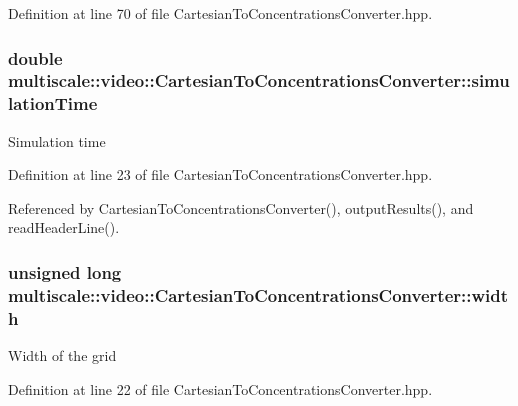 \-Definition at line 70 of file \-Cartesian\-To\-Concentrations\-Converter.\-hpp.

\hypertarget{classmultiscale_1_1video_1_1CartesianToConcentrationsConverter_a6e66af60b82513b3186fdb32cad44597}{
\subsubsection[{simulation\-Time}]{\setlength{\rightskip}{0pt plus 5cm}double {\bf multiscale\-::video\-::\-Cartesian\-To\-Concentrations\-Converter\-::simulation\-Time}}}\label{classmultiscale_1_1video_1_1CartesianToConcentrationsConverter_a6e66af60b82513b3186fdb32cad44597}
\-Simulation time 

\-Definition at line 23 of file \-Cartesian\-To\-Concentrations\-Converter.\-hpp.



\-Referenced by \-Cartesian\-To\-Concentrations\-Converter(), output\-Results(), and read\-Header\-Line().

\hypertarget{classmultiscale_1_1video_1_1CartesianToConcentrationsConverter_ae6fba5af405d884c7b70ed206a6d5cb1}{
\subsubsection[{width}]{\setlength{\rightskip}{0pt plus 5cm}unsigned long {\bf multiscale\-::video\-::\-Cartesian\-To\-Concentrations\-Converter\-::width}}}\label{classmultiscale_1_1video_1_1CartesianToConcentrationsConverter_ae6fba5af405d884c7b70ed206a6d5cb1}
\-Width of the grid 

\-Definition at line 22 of file \-Cartesian\-To\-Concentrations\-Converter.\-hpp.



